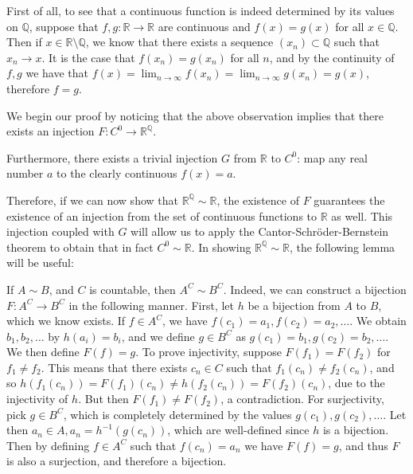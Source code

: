 \begin{solution}
    
    First of all, to see that a continuous function is indeed determined by its values on $\mathbb{Q}$, suppose that $f, g: \mathbb{R} \rightarrow \mathbb{R}$ are continuous and $f(x) = g(x)$ for all $x \in \mathbb{Q}$.
    Then if $x \in \mathbb{R} \setminus \mathbb{Q}$, we know that there exists a sequence $(x_n) \subset \mathbb{Q}$ such that $x_n \rightarrow x$.
    It is the case that $f(x_n) = g(x_n)$ for all $n$, and by the continuity of $f, g$ we have that $f(x) = \lim_{n \rightarrow \infty} f(x_n) = \lim_{n \rightarrow \infty} g(x_n) = g(x)$, therefore $f = g$.

    We begin our proof by noticing that the above observation implies that there exists an injection $F: C^0 \rightarrow \mathbb{R}^{\mathbb{Q}}$.

    Furthermore, there exists a trivial injection $G$ from $\mathbb{R}$ to $C^0$: map any real number $a$ to the clearly continuous $f(x) = a$.

    Therefore, if we can now show that $\mathbb{R}^{\mathbb{Q}} \sim \mathbb{R}$, the existence of $F$ guarantees the existence of an injection from the set of continuous functions to $\mathbb{R}$ as well.
    This injection coupled with $G$ will allow us to apply the Cantor-Schröder-Bernstein theorem to obtain that in fact $C^0 \sim \mathbb{R}$.
    In showing $\mathbb{R}^{\mathbb{Q}} \sim \mathbb{R}$, the following lemma will be useful: 
    
    If $A \sim B$, and $C$ is countable, then $A^{C} \sim B^{C}$.
    Indeed, we can construct a bijection $F: A^{C} \rightarrow B^{C}$ in the following manner.
    First, let $h$ be a bijection from $A$ to $B$, which we know exists.
    If $f \in A^{C}$, we have $f(c_1) = a_1, f(c_2) = a_2, \ldots$.
    We obtain $b_1, b_2, \ldots$ by $h(a_i) = b_i$, and we define $g \in B^{C}$ as $g(c_1) = b_1, g(c_2) = b_2, \ldots$.
    We then define $F(f) = g$.
    To prove injectivity, suppose $F(f_1) = F(f_2)$ for $f_1 \neq f_2$.
    This means that there exists $c_n \in C$ such that $f_1(c_n) \neq f_2(c_n)$, and so $h(f_1(c_n)) = F(f_1)(c_n) \neq h(f_2(c_n)) = F(f_2)(c_n)$, due to the injectivity of $h$.
    But then $F(f_1) \neq F(f_2)$, a contradiction.
    For surjectivity, pick $g \in B^{C}$, which is completely determined by the values $g(c_1), g(c_2), \ldots$.
    Let then $a_n \in A, a_n = h^{-1}(g(c_n))$, which are well-defined since $h$ is a bijection.
    Then by defining $f \in A^{C}$ such that $f(c_n) = a_n$ we have $F(f) = g$, and thus $F$ is also a surjection, and therefore a bijection.


\end{solution}
